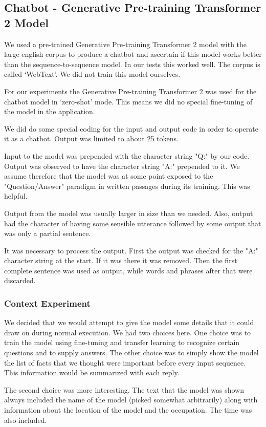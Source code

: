 \subsection{Chatbot - Generative Pre-training Transformer 2 Model}
We used a pre-trained Generative Pre-training Transformer 2 model with the large english corpus to produce a chatbot and ascertain if this model works better than the sequence-to-sequence model. In our tests this worked well. The corpus is called `WebText'. We did not train this model ourselves.

For our experiments the Generative Pre-training Transformer 2 was used for the chatbot model in `zero-shot' mode. This means we did no special fine-tuning of the model in the application.

We did do some special coding for the input and output code in order to operate it as a chatbot. Output was limited to about 25 tokens. 

Input to the model was prepended with the character string "Q:" by our code. Output was observed to have the character string "A:" prepended to it. We assume therefore that the model was at some point exposed to the "Question/Answer" paradigm in written passages during its training. This was helpful.

Output from the model was usually larger in size than we needed. Also, output had the character of having some sensible utterance followed by some output that was only a partial sentence.

It was necessary to process the output. First the output was checked for the "A:" character string at the start. If it was there it was removed. Then the first complete sentence was used as output, while words and phrases after that were discarded.

\subsubsection{Context Experiment}
We decided that we would attempt to give the model some details that it could draw on during normal execution. We had two choices here. One choice was to train the model using fine-tuning and transfer learning to recognize certain questions and to supply answers. The other choice was to simply show the model the list of facts that we thought were important before every input sequence. This information would be summarized with each reply.

The second choice was more interesting. The text that the model was shown always included the name of the model (picked somewhat arbitrarily) along with information about the location of the model and the occupation. The time was also included.

